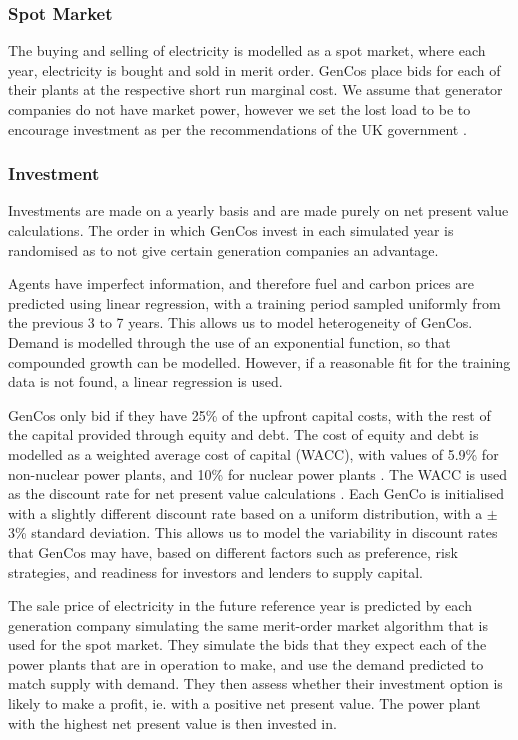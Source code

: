 \subsubsection{Spot Market}

The buying and selling of electricity is modelled as a spot market, where each year, electricity is bought and sold in merit order. GenCos place bids for each of their plants at the respective short run marginal cost. We assume that generator companies do not have market power, however we set the lost load to be  to encourage investment as per the recommendations of the UK government \cite{DECC2013}.

\subsubsection{Investment}

Investments are made on a yearly basis and are made purely on net present value calculations. The order in which GenCos invest in each simulated year is randomised as to not give certain generation companies an advantage.

Agents have imperfect information, and therefore fuel and carbon prices are predicted using linear regression, with a training period sampled uniformly from the previous 3 to 7 years. This allows us to model heterogeneity of GenCos. Demand is modelled through the use of an exponential function, so that compounded growth can be modelled. However, if a reasonable fit for the training data is not found, a linear regression is used.

GenCos only bid if they have 25\% of the upfront capital costs, with the rest of the capital provided through equity and debt. The cost of equity and debt is modelled as a weighted average cost of capital (WACC), with values of 5.9\% for non-nuclear power plants, and 10\% for nuclear power plants \cite{KPMG2017, Paper2012}. The WACC is used as the discount rate for net present value calculations \cite{KincheloeStephenC1990TWAC}. Each GenCo is initialised with a slightly different discount rate based on a uniform distribution, with a $\pm$3\% standard deviation. This allows us to model the variability in discount rates that GenCos may have, based on different factors such as preference, risk strategies, and readiness for investors and lenders to supply capital.

The sale price of electricity in the future reference year is predicted by each generation company simulating the same merit-order market algorithm that is used for the spot market. They simulate the bids that they expect each of the power plants that are in operation to make, and use the demand predicted to match supply with demand. They then assess whether their investment option is likely to make a profit, ie. with a positive net present value. The power plant with the highest net present value is then invested in. 




